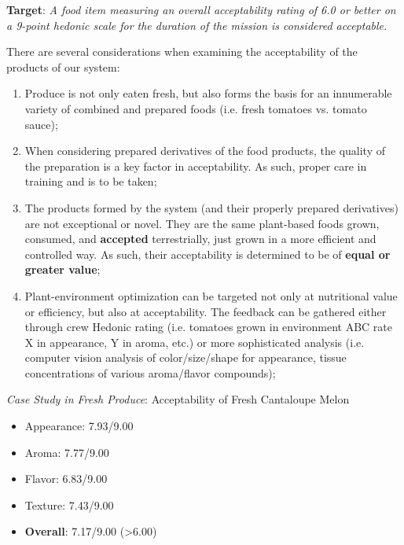 \documentclass{report}
\begin{document}
\textbf{Target}: \textit{A food item measuring an overall acceptability rating of 6.0 or better on a 9-point hedonic scale for the duration of the mission is considered acceptable.}


There are several considerations when examining the acceptability of the products of our system:

\begin{enumerate}
    \item Produce is not only eaten fresh, but also forms the basis for an innumerable variety of combined and prepared foods (i.e. fresh tomatoes vs. tomato sauce);
    \item When considering prepared derivatives of the food products, the quality of the preparation is a key factor in acceptability. As such, proper care in training and is to be taken;
    \item The products formed by the system (and their properly prepared derivatives) are not exceptional or novel. They are the same plant-based foods grown, consumed, and \textbf{accepted} terrestrially, just grown in a more efficient and controlled way. As such, their acceptability is determined to be of \textbf{equal or greater value};
    \item Plant-environment optimization can be targeted not only at nutritional value or efficiency, but also at acceptability. The feedback can be gathered either through crew Hedonic rating (i.e. tomatoes grown in environment ABC rate X in appearance, Y in aroma, etc.) or more sophisticated analysis (i.e. computer vision analysis of color/size/shape for appearance, tissue concentrations of various aroma/flavor compounds); %
\end{enumerate}

\textit{Case Study in Fresh Produce}: Acceptability of Fresh Cantaloupe Melon %

\begin{itemize}
    \item Appearance: 7.93/9.00
    \item Aroma: 7.77/9.00
    \item Flavor: 6.83/9.00
    \item Texture: 7.43/9.00
    \item \textbf{Overall}: 7.17/9.00 (>6.00)
\end{itemize}
\end{document}
